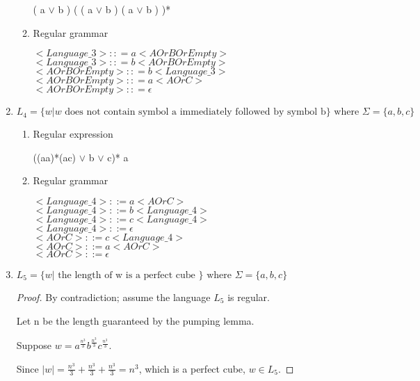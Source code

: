 \begin{enumerate}
\begin{enumerate}
		( a \(\vee\) b ) ( ( a \(\vee\)  b ) ( a \(\vee\) b ) )*
		\item{Regular grammar}
		
		\( <Language\_3> :: = a <AOrBOrEmpty> \)\\
		\( <Language\_3> :: = b <AOrBOrEmpty> \)\\
		\( <AOrBOrEmpty> :: = b <Language\_3> \)\\
		\( <AOrBOrEmpty> :: = a <AOrC> \)\\
		\( <AOrBOrEmpty> :: = \epsilon \)
	\end{enumerate}
	
	\item\(L_4 = \{ w | w \text{ does not contain symbol a immediately followed by symbol b} \} \text{ where } \Sigma = \{ a, b, c \} \)
		
	
	\begin{enumerate}
		\item{Regular expression}
		
		((aa)*(ac) \(\vee\) b \(\vee\) c)* a
		\item{Regular grammar}
		
		\( <Language\_4> ::= a <AOrC> \)\\
		\( <Language\_4> ::= b <Language\_4> \)\\
		\( <Language\_4> ::= c <Language\_4> \)\\
		\( <Language\_4> ::= \epsilon \)\\
		\( <AOrC> ::= c <Language\_4> \)\\
		\( <AOrC> ::= a <AOrC> \)\\
		\( <AOrC> ::= \epsilon \)\\
		
	\end{enumerate}
	
	\item\(L_5 = \{ w | \text{ the length of w is a perfect cube } \} \text{ where } \Sigma = \{ a, b, c \} \)
	
	\begin{proof}
	By contradiction; assume the language \(L_5\) is regular.
	
	Let n be the length guaranteed by the pumping lemma.   
	
	Suppose \( w = a^{\frac{n^3}{3}} b^{\frac{n^3}{3}} c^{\frac{n^3}{3}} \).
	
	Since \( |w| = \frac{n^3}{3} + \frac{n^3}{3} + \frac{n^3}{3} = n^3 \), which is a perfect cube, \( w \in L_5 \).
	

\end{proof}
\end{enumerate}

